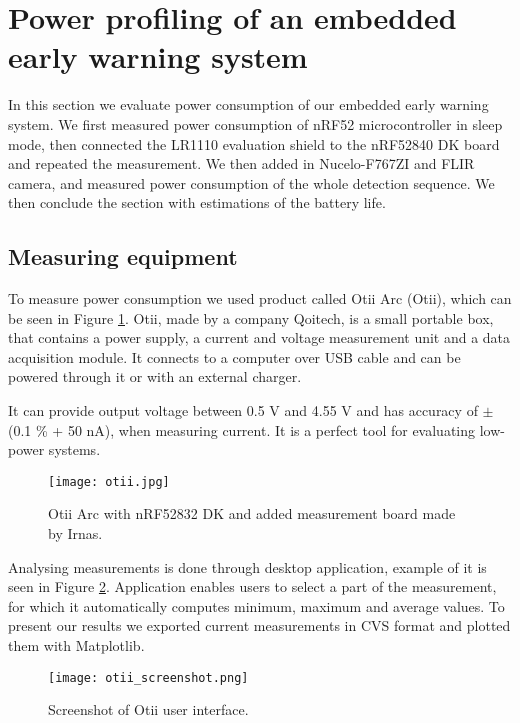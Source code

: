 \section{ Power profiling of an embedded early warning system}

In this section we evaluate power consumption of our embedded early warning system.
We first measured power consumption of nRF52 microcontroller in sleep mode, then connected the LR1110 evaluation shield to the nRF52840 DK board and repeated the measurement.
We then added in Nucelo-F767ZI and FLIR camera, and measured power consumption of the whole detection sequence.
We then conclude the section with estimations of the battery life.


\subsection{ Measuring equipment}

To measure power consumption we used product called Otii Arc (Otii), which can be seen in Figure \ref{otii}.
Otii, made by a company Qoitech, is a small portable box, that contains a power supply, a current and voltage measurement unit and a data acquisition module.
It connects to a computer over USB cable and can be powered through it or with an external charger.

It can provide output voltage between 0.5 V and 4.55 V and has accuracy of $\pm$(0.1 \% + 50 nA), when measuring current.
It is a perfect tool for evaluating low-power systems.

\begin{figure}[ht]
    \centering
    \texttt{[image: otii.jpg]}
    \caption{ Otii Arc with nRF52832 DK and added measurement board made by Irnas.}
    \label{otii}
\end{figure}

Analysing measurements is done through desktop application, example of it is seen in Figure \ref{otii_screen}. 
Application enables users to select a part of the measurement, for which it automatically computes minimum, maximum and average values.
To present our results we exported current measurements in CVS format and plotted them with Matplotlib.

\begin{figure}[ht]
    \centering
    \texttt{[image: otii\_screenshot.png]}
    \caption{ Screenshot of Otii user interface.}
    \label{otii_screen}
\end{figure}

